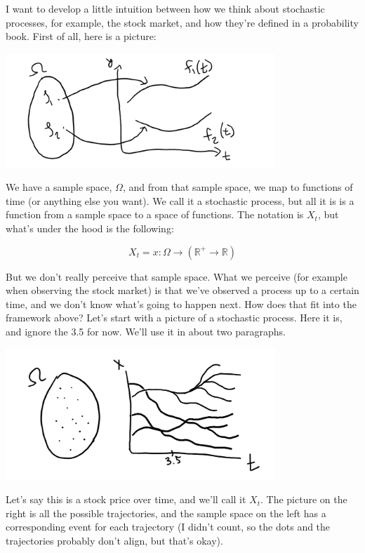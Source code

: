 \documentclass{article}
\begin{document}
I want to develop a little intuition between how we think about stochastic processes, for example, the stock market, and how they're defined in a probability book.  First of all, here is a picture:

\includegraphics[width=4in]{stochastic_ image.png}
\centering

We have a sample space, $\Omega$, and from that sample space, we map to functions of time (or anything else you want).  We call it a stochastic process, but all it is is a function from a sample space to a space of functions.  The notation is $X_t$, but what's under the hood is the following:

$$X_t = x : \Omega \rightarrow \left(\mathbb{R}^+ \rightarrow  \mathbb{R} \right)$$ 

But we don't really perceive that sample space.  What we perceive (for example when observing the stock market) is that we've observed a process up to a certain time, and we don't know what's going to happen next.  How does that fit into the framework above? Let's start with a picture of a stochastic process.  Here it is, and ignore the 3.5 for now. We'll use it in about two paragraphs.

\includegraphics[width=4in]{filtration_part_1.png}
\centering

Let's say this is a stock price over time, and we'll call it $X_t$.  The picture on the right is all the possible trajectories, and the sample space on the left has a corresponding event for each trajectory (I didn't count, so the dots and the trajectories probably don't align, but that's okay).
\end{document}
